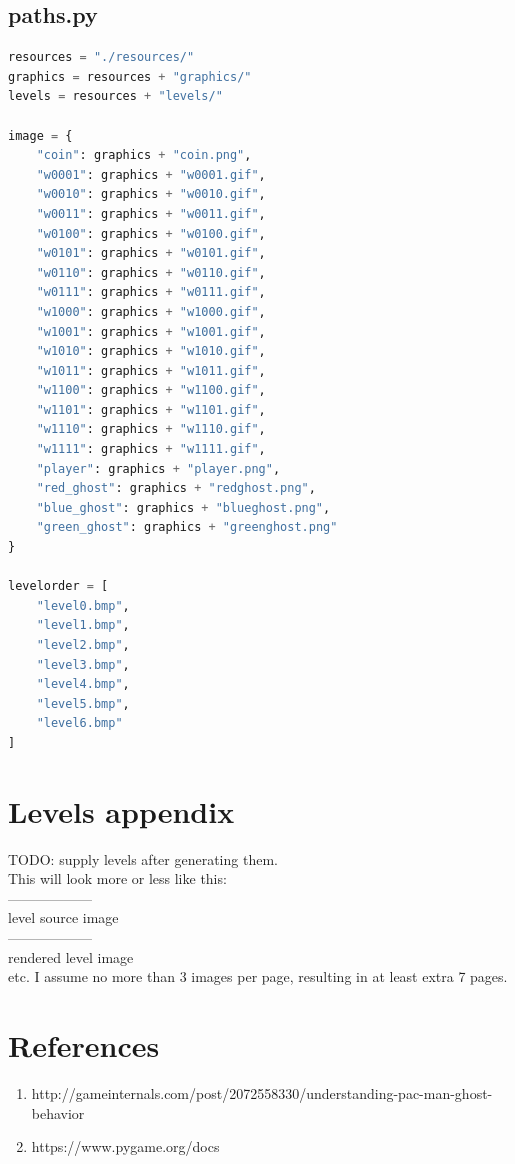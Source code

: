\documentclass[11pt,a4paper]{report}
\begin{document}
		\section{paths.py}
			\begin{lstlisting}[language = Python]
resources = "./resources/"
graphics = resources + "graphics/"
levels = resources + "levels/"

image = {
	"coin": graphics + "coin.png",
	"w0001": graphics + "w0001.gif",
	"w0010": graphics + "w0010.gif",
	"w0011": graphics + "w0011.gif",
	"w0100": graphics + "w0100.gif",
	"w0101": graphics + "w0101.gif",
	"w0110": graphics + "w0110.gif",
	"w0111": graphics + "w0111.gif",
	"w1000": graphics + "w1000.gif",
	"w1001": graphics + "w1001.gif",
	"w1010": graphics + "w1010.gif",
	"w1011": graphics + "w1011.gif",
	"w1100": graphics + "w1100.gif",
	"w1101": graphics + "w1101.gif",
	"w1110": graphics + "w1110.gif",
	"w1111": graphics + "w1111.gif",
	"player": graphics + "player.png",
	"red_ghost": graphics + "redghost.png",
	"blue_ghost": graphics + "blueghost.png",
	"green_ghost": graphics + "greenghost.png"
}

levelorder = [
	"level0.bmp",
	"level1.bmp",
	"level2.bmp",
	"level3.bmp",
	"level4.bmp",
	"level5.bmp",
	"level6.bmp"
]
			\end{lstlisting}
	\chapter{Levels appendix}
		TODO: supply levels after generating them.\\
		This will look more or less like this:\\
		------------------\\
		level source image\\
		------------------\\
		rendered level image\\
		etc. I assume no more than 3 images per page, resulting in at least extra 7 pages.
	\chapter{References}
		\begin{enumerate}
			\item
				http://gameinternals.com/post/2072558330/understanding-pac-man-ghost-behavior
				\label{stronaopacmanie}
			\item
				https://www.pygame.org/docs
				\label{pygamedocs}
		\end{enumerate}
			
\end{document}
